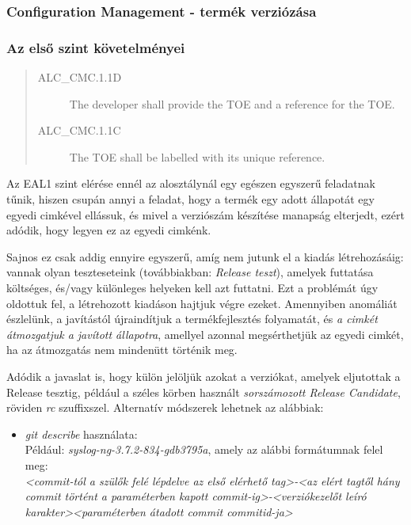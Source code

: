 \pagebreak[0]
\subsubsection{Configuration Management - termék verziózása}
\subsubsection{Az első szint követelményei}
\begin{quote}
    \begin{description}
        \item[ALC\_CMC.1.1D]{The developer shall provide the TOE and a reference for the TOE.}
        \item[ALC\_CMC.1.1C]{The TOE shall be labelled with its unique reference.}
    \end{description}
\end{quote}

Az EAL1 szint elérése ennél az alosztálynál egy egészen egyszerű feladatnak tűnik, hiszen csupán
annyi a feladat, hogy a termék egy adott állapotát egy egyedi cimkével ellássuk, és mivel a
verziószám készítése manapság elterjedt, ezért adódik, hogy legyen ez az egyedi cimkénk.

Sajnos ez csak addig ennyire egyszerű, amíg nem jutunk el a kiadás létrehozásáig:
vannak olyan teszteseteink (továbbiakban: \emph{Release teszt}),
amelyek futtatása költséges, és/vagy különleges helyeken kell azt
futtatni. Ezt a problémát úgy oldottuk fel, a létrehozott kiadáson hajtjuk végre ezeket.
Amennyiben anomáliát észlelünk, a javítástól újraindítjuk a termékfejlesztés folyamatát,
és \emph{a cimkét átmozgatjuk a javított állapotra}, amellyel azonnal megsérthetjük az egyedi
cimkét, ha az átmozgatás nem mindenütt történik meg.

Adódik a javaslat is, hogy külön jelöljük azokat a verziókat, amelyek eljutottak a Release tesztig,
például a széles körben használt \emph{sorszámozott Release Candidate}, röviden \emph{rc}
szuffixszel.
Alternatív módszerek lehetnek az alábbiak:
\begin{itemize}
    \item \emph{git describe} használata: \\
        Például: \emph{syslog-ng-3.7.2-834-gdb3795a}, amely az alábbi formátumnak felel meg: \\
        \emph{<commit-tól a szülők felé lépdelve az első elérhető tag>-<az elért tagtől hány commit
            történt a paraméterben kapott commit-ig>-<verziókezelőt leíró karakter><paraméterben
        átadott commit commitid-ja>}
\end{itemize}

